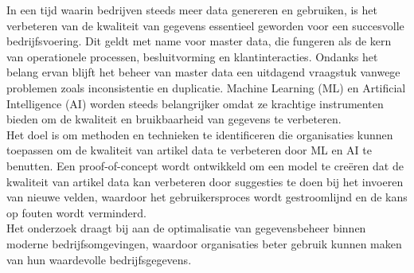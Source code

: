 In een tijd waarin bedrijven steeds meer data genereren en gebruiken, is het verbeteren van de kwaliteit van gegevens essentieel geworden voor een succesvolle bedrijfsvoering. Dit geldt met name voor master data, die fungeren als de kern van operationele processen, besluitvorming en klantinteracties. Ondanks het belang ervan blijft het beheer van master data een uitdagend vraagstuk vanwege problemen zoals inconsistentie en duplicatie. Machine Learning (ML) en Artificial Intelligence (AI) worden steeds belangrijker omdat ze krachtige instrumenten bieden om de kwaliteit en bruikbaarheid van gegevens te verbeteren.
\\
Het doel is om methoden en technieken te identificeren die organisaties kunnen toepassen om de kwaliteit van artikel data te verbeteren door ML en AI te benutten. Een proof-of-concept wordt ontwikkeld om een model te creëren dat de kwaliteit van artikel data kan verbeteren door suggesties te doen bij het invoeren van nieuwe velden, waardoor het gebruikersproces wordt gestroomlijnd en de kans op fouten wordt verminderd. 
\\
Het onderzoek draagt bij aan de optimalisatie van gegevensbeheer binnen moderne bedrijfsomgevingen, waardoor organisaties beter gebruik kunnen maken van hun waardevolle bedrijfsgegevens.

